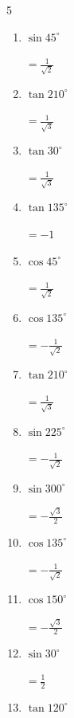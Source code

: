 \begin{multicols}{5}
\begin{enumerate}
\columnbreak %

  \item $\displaystyle \sin{45^\circ}$

        $\displaystyle =\frac{1}{\sqrt{2}}$

  \item $\displaystyle \tan{210^\circ}$

        $\displaystyle =\frac{1}{\sqrt{3}}$

  \item $\displaystyle \tan{30^\circ}$

        $\displaystyle =\frac{1}{\sqrt{3}}$

  \item $\displaystyle \tan{135^\circ}$

        $\displaystyle =-1$

  \item $\displaystyle \cos{45^\circ}$

        $\displaystyle =\frac{1}{\sqrt{2}}$

  \item $\displaystyle \cos{135^\circ}$

        $\displaystyle =-\frac{1}{\sqrt{2}}$

  \item $\displaystyle \tan{210^\circ}$

        $\displaystyle =\frac{1}{\sqrt{3}}$

  \item $\displaystyle \sin{225^\circ}$

        $\displaystyle =-\frac{1}{\sqrt{2}}$

  \item $\displaystyle \sin{300^\circ}$

        $\displaystyle =-\frac{\sqrt{3}}{2}$

  \item $\displaystyle \cos{135^\circ}$

        $\displaystyle =-\frac{1}{\sqrt{2}}$

  \item $\displaystyle \cos{150^\circ}$

        $\displaystyle =-\frac{\sqrt{3}}{2}$

  \item $\displaystyle \sin{30^\circ}$

        $\displaystyle =\frac{1}{2}$

  \item $\displaystyle \tan{120^\circ}$


\end{enumerate}
\end{multicols}
